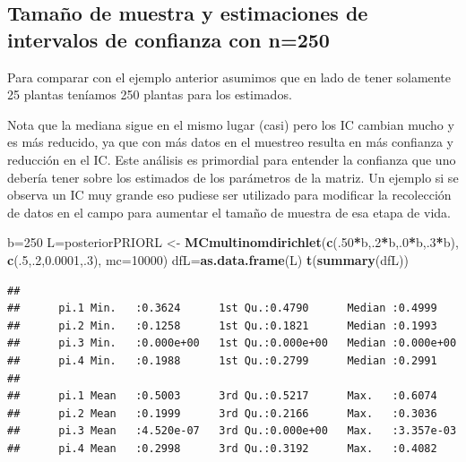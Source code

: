 \documentclass[
]{book}
\newenvironment{Shaded}{\begin{snugshade}}{\end{snugshade}}
\newcommand{\AttributeTok}[1]{\textcolor[rgb]{0.13,0.29,0.53}{#1}}
\newcommand{\DecValTok}[1]{\textcolor[rgb]{0.00,0.00,0.81}{#1}}
\newcommand{\FloatTok}[1]{\textcolor[rgb]{0.00,0.00,0.81}{#1}}
\newcommand{\FunctionTok}[1]{\textcolor[rgb]{0.13,0.29,0.53}{\textbf{#1}}}
\newcommand{\NormalTok}[1]{#1}
\newcommand{\OtherTok}[1]{\textcolor[rgb]{0.56,0.35,0.01}{#1}}
\newcommand{\SpecialCharTok}[1]{\textcolor[rgb]{0.81,0.36,0.00}{\textbf{#1}}}
\theoremstyle{definition}
\theoremstyle{definition}
\theoremstyle{definition}
\theoremstyle{definition}
\theoremstyle{remark}
\begin{document}
\subsection{Tamaño de muestra y estimaciones de intervalos de confianza con n=250}\label{tamauxf1o-de-muestra-y-estimaciones-de-intervalos-de-confianza-con-n250}

Para comparar con el ejemplo anterior asumimos que en lado de tener solamente 25 plantas teníamos 250 plantas para los estimados.

Nota que la mediana sigue en el mismo lugar (casi) pero los IC cambian mucho y es más reducido, ya que con más datos en el muestreo resulta en más confianza y reducción en el IC. Este análisis es primordial para entender la confianza que uno debería tener sobre los estimados de los parámetros de la matriz. Un ejemplo si se observa un IC muy grande eso pudiese ser utilizado para modificar la recolección de datos en el campo para aumentar el tamaño de muestra de esa etapa de vida.

\begin{Shaded}
\begin{Highlighting}[]
\NormalTok{b}\OtherTok{=}\DecValTok{250}
\NormalTok{L}\OtherTok{=}\NormalTok{posteriorPRIORL }\OtherTok{\textless{}{-}} \FunctionTok{MCmultinomdirichlet}\NormalTok{(}\FunctionTok{c}\NormalTok{(.}\DecValTok{50}\SpecialCharTok{*}\NormalTok{b,.}\DecValTok{2}\SpecialCharTok{*}\NormalTok{b,.}\DecValTok{0}\SpecialCharTok{*}\NormalTok{b,.}\DecValTok{3}\SpecialCharTok{*}\NormalTok{b), }\FunctionTok{c}\NormalTok{(.}\DecValTok{5}\NormalTok{,.}\DecValTok{2}\NormalTok{,}\FloatTok{0.0001}\NormalTok{,.}\DecValTok{3}\NormalTok{), }\AttributeTok{mc=}\DecValTok{10000}\NormalTok{)}
\NormalTok{dfL}\OtherTok{=}\FunctionTok{as.data.frame}\NormalTok{(L)}
\FunctionTok{t}\NormalTok{(}\FunctionTok{summary}\NormalTok{(dfL))}
\end{Highlighting}
\end{Shaded}

\begin{verbatim}
##                                                                      
##      pi.1 Min.   :0.3624      1st Qu.:0.4790      Median :0.4999     
##      pi.2 Min.   :0.1258      1st Qu.:0.1821      Median :0.1993     
##      pi.3 Min.   :0.000e+00   1st Qu.:0.000e+00   Median :0.000e+00  
##      pi.4 Min.   :0.1988      1st Qu.:0.2799      Median :0.2991     
##                                                                      
##      pi.1 Mean   :0.5003      3rd Qu.:0.5217      Max.   :0.6074     
##      pi.2 Mean   :0.1999      3rd Qu.:0.2166      Max.   :0.3036     
##      pi.3 Mean   :4.520e-07   3rd Qu.:0.000e+00   Max.   :3.357e-03  
##      pi.4 Mean   :0.2998      3rd Qu.:0.3192      Max.   :0.4082
\end{verbatim}
\end{document}
